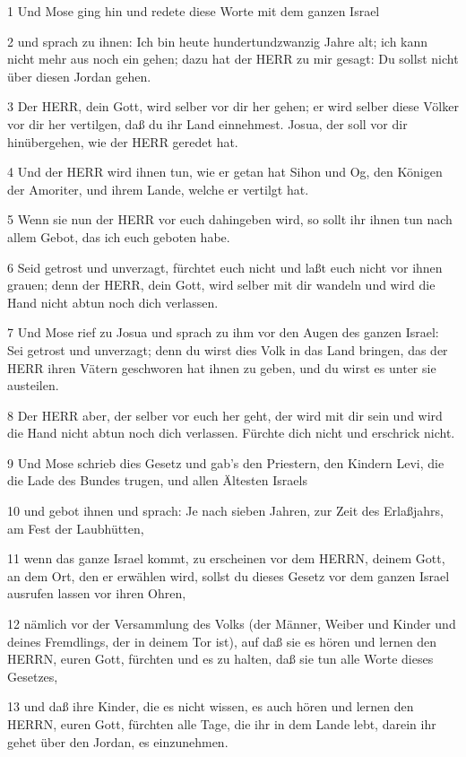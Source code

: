 \par 1 Und Mose ging hin und redete diese Worte mit dem ganzen Israel
\par 2 und sprach zu ihnen: Ich bin heute hundertundzwanzig Jahre alt; ich kann nicht mehr aus noch ein gehen; dazu hat der HERR zu mir gesagt: Du sollst nicht über diesen Jordan gehen.
\par 3 Der HERR, dein Gott, wird selber vor dir her gehen; er wird selber diese Völker vor dir her vertilgen, daß du ihr Land einnehmest. Josua, der soll vor dir hinübergehen, wie der HERR geredet hat.
\par 4 Und der HERR wird ihnen tun, wie er getan hat Sihon und Og, den Königen der Amoriter, und ihrem Lande, welche er vertilgt hat.
\par 5 Wenn sie nun der HERR vor euch dahingeben wird, so sollt ihr ihnen tun nach allem Gebot, das ich euch geboten habe.
\par 6 Seid getrost und unverzagt, fürchtet euch nicht und laßt euch nicht vor ihnen grauen; denn der HERR, dein Gott, wird selber mit dir wandeln und wird die Hand nicht abtun noch dich verlassen.
\par 7 Und Mose rief zu Josua und sprach zu ihm vor den Augen des ganzen Israel: Sei getrost und unverzagt; denn du wirst dies Volk in das Land bringen, das der HERR ihren Vätern geschworen hat ihnen zu geben, und du wirst es unter sie austeilen.
\par 8 Der HERR aber, der selber vor euch her geht, der wird mit dir sein und wird die Hand nicht abtun noch dich verlassen. Fürchte dich nicht und erschrick nicht.
\par 9 Und Mose schrieb dies Gesetz und gab's den Priestern, den Kindern Levi, die die Lade des Bundes trugen, und allen Ältesten Israels
\par 10 und gebot ihnen und sprach: Je nach sieben Jahren, zur Zeit des Erlaßjahrs, am Fest der Laubhütten,
\par 11 wenn das ganze Israel kommt, zu erscheinen vor dem HERRN, deinem Gott, an dem Ort, den er erwählen wird, sollst du dieses Gesetz vor dem ganzen Israel ausrufen lassen vor ihren Ohren,
\par 12 nämlich vor der Versammlung des Volks (der Männer, Weiber und Kinder und deines Fremdlings, der in deinem Tor ist), auf daß sie es hören und lernen den HERRN, euren Gott, fürchten und es zu halten, daß sie tun alle Worte dieses Gesetzes,
\par 13 und daß ihre Kinder, die es nicht wissen, es auch hören und lernen den HERRN, euren Gott, fürchten alle Tage, die ihr in dem Lande lebt, darein ihr gehet über den Jordan, es einzunehmen.
